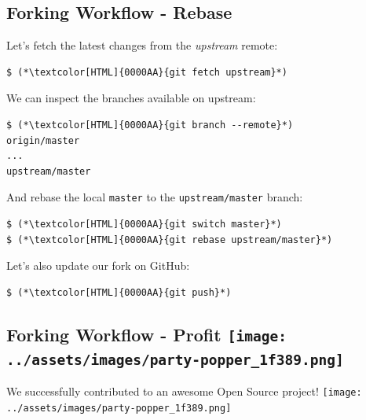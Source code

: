 \subsection{Forking Workflow - Rebase}
\begin{frame}[fragile]
  \subslidetitle

  Let's fetch the latest changes from the \textit{upstream} remote:

  \begin{lstlisting}
$ (*\textcolor[HTML]{0000AA}{git fetch upstream}*)
\end{lstlisting}

  We can inspect the branches available on upstream:

  \begin{lstlisting}
$ (*\textcolor[HTML]{0000AA}{git branch --remote}*)
origin/master
...
upstream/master
\end{lstlisting}

  And rebase the local \lstinline{master} to the \lstinline{upstream/master} branch:

  \begin{lstlisting}
$ (*\textcolor[HTML]{0000AA}{git switch master}*)
$ (*\textcolor[HTML]{0000AA}{git rebase upstream/master}*)
\end{lstlisting}

  Let's also update our fork on GitHub:

  \begin{lstlisting}
$ (*\textcolor[HTML]{0000AA}{git push}*)
\end{lstlisting}

\end{frame}

\subsection{Forking Workflow - Profit \texttt{[image: ../assets/images/party-popper\_1f389.png]}}
\begin{frame}[fragile]
  \subslidetitle

  \vspace{8em}
  \begin{center}
      We successfully contributed to an awesome Open Source project! \texttt{[image: ../assets/images/party-popper\_1f389.png]}
  \end{center}

\end{frame}

